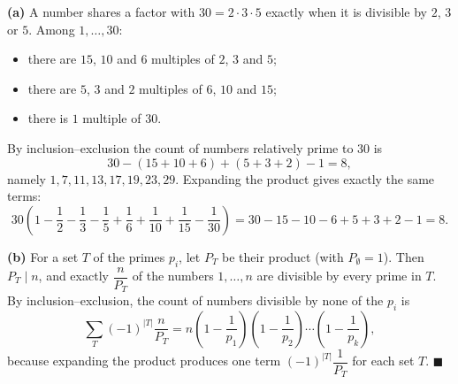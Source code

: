 \textbf{(a)} A number shares a factor with $30=2\cdot3\cdot5$ exactly when it is divisible by $2$, $3$ or $5$. Among $1,\dots,30$:
\begin{itemize}
\item there are $15$, $10$ and $6$ multiples of $2$, $3$ and $5$;
\item there are $5$, $3$ and $2$ multiples of $6$, $10$ and $15$;
\item there is $1$ multiple of $30$.
\end{itemize}
By inclusion--exclusion the count of numbers relatively prime to $30$ is
\[30-(15+10+6)+(5+3+2)-1=8,\]
namely $1,7,11,13,17,19,23,29$. Expanding the product gives exactly the same terms:
\[30\left(1-\dfrac12-\dfrac13-\dfrac15+\dfrac16+\dfrac1{10}+\dfrac1{15}-\dfrac1{30}\right)=30-15-10-6+5+3+2-1=8.\]

\textbf{(b)} For a set $T$ of the primes $p_i$, let $P_T$ be their product (with $P_\emptyset=1$). Then $P_T\mid n$, and exactly $\dfrac{n}{P_T}$ of the numbers $1,\dots,n$ are divisible by every prime in $T$. By inclusion--exclusion, the count of numbers divisible by none of the $p_i$ is
\[\sum_{T}(-1)^{|T|}\dfrac{n}{P_T}=n\left(1-\dfrac{1}{p_1}\right)\left(1-\dfrac{1}{p_2}\right)\cdots\left(1-\dfrac{1}{p_k}\right),\]
because expanding the product produces one term $(-1)^{|T|}\dfrac{1}{P_T}$ for each set $T$. $\blacksquare$
